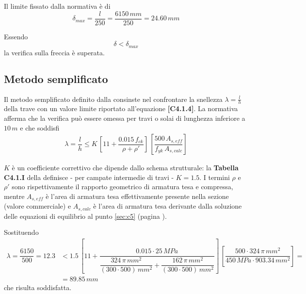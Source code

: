 Il limite fissato dalla normativa è di
\[
\delta_{max} = \dfrac{l}{250} = \dfrac{6150\,mm}{250} = 24.60\,mm
\]

Essendo
\[
\delta < \delta_{max} 
\]
la verifica sulla freccia è superata.

\subsection{Metodo semplificato}
Il metodo semplificato definito dalla \circolare consinste nel confrontare la snellezza $\lambda = \frac{l}{h}$ della trave con un valore limite riportato all'equazione \textbf{[C4.1.4]}. La normativa afferma che la verifica può essere omessa per travi o solai di lunghezza inferiore a $10\,m$ e che soddisfi
\begin{align*}
	\lambda = \dfrac{l}{h} \leq K\,\left[11 + \dfrac{0.015\,f_{ck}}{\rho + \rho'}\right]\,\left[\dfrac{500\,A_{s,eff}}{f_{yk}\,A_{s,calc}}\right]
\end{align*}

$K$ è un coefficiente correttivo che dipende dallo schema strutturale: la \textbf{Tabella C4.1.I} della \circolare definisce - per campate intermedie di travi - $K = 1.5$. I termini $\rho$ e $\rho'$ sono rispettivamente il rapporto geometrico di armatura tesa e compressa, mentre $A_{s,eff}$ è l'area di armatura tesa effettivamente presente nella sezione (valore commerciale) e $A_{s, calc}$ è l'area di armatura tesa derivante dalla soluzione delle equazioni di equilibrio al punto \ref{sec:c5} (pagina \pageref{sec:c5}).

Sostituendo
\begin{align*}
\lambda = \dfrac{6150}{500} = 12.3 &< 1.5\,\left[11 + \dfrac{0.015\cdot 25\,MPa}{\dfrac{324\,\pi\,mm^2}{(300\cdot 500)\,mm^2} + \dfrac{162\,\pi\,mm^2}{(300\cdot 500)\,mm^2}}\right]\,\left[\dfrac{500\cdot 324\,\pi\,mm^2}{450\,MPa\cdot 903.34\,mm^2}\right] = \\
&= 89.85\,mm
\end{align*}
che risulta soddisfatta. 
\cleardoublepage
